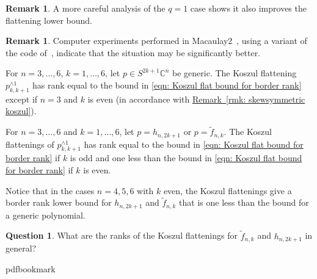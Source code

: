 \documentclass[11pt]{article}
\numberwithin{equation}{section}
\theoremstyle{definition}
\newtheorem{remark}[theorem]{Remark}
\newtheorem{question}[theorem]{Question}
\theoremstyle{plain}
\newcommand{\expref}[2]{\hyperref[#2]{#1~\ref{#2}}}
\newcommand{\vvirg}{ , \dots , }
\newcommand{\bbC}{\mathbb{C}}
\renewcommand{\tilde}[1]{\widetilde{#1}}
\begin{document}
 \begin{remark}
A more careful analysis of the $q=1$ case shows it also improves the flattening lower bound.
\end{remark}

\begin{remark}\label{koscomputer}
Computer experiments performed in Macaulay2~\cite{M2}, using a variant of the code of~\cite{OedOtt:EgnvectorsTensorsAlgorithmsWaringDecomp}, indicate that the situation may be significantly better. 

For $ n = 3 \vvirg 6$, $k = 1 \vvirg 6$, let $p \in S^{2k+1}\bbC^n$ be generic. The Koszul flattening $p_{k,k+1}^{\wedge 1}$ has rank equal to the bound in \eqref{eqn: Koszul flat bound for border rank} except if $n=3$ and $k$ is even (in accordance with \expref{Remark}{rmk: skewsymmetric koszul}).

For  $n = 3 \vvirg 6$ and $k= 1 \vvirg 6$, let $p = h_{n,2k+1}$ or $p = \tilde f_{n,k}$. The Koszul flattenings of $p_{k,k+1}^{\wedge 1}$ has rank equal to the bound in \eqref{eqn: Koszul flat bound for border rank} if $k$ is odd and one less than the bound in \eqref{eqn: Koszul flat bound for border rank} if $k$ is even.
\end{remark}

Notice that in the cases $n=4,5,6$ with $k$ even, the Koszul flattenings give a border rank lower bound for $h_{n,2k+1}$ and $\tilde f_{n,k}$ that is one less than the bound for a generic polynomial.


\begin{question} What are the ranks of the Koszul flattenings for $\tilde f_{n,k}$ and $h_{n,2k+1}$ in general?
\end{question}

\providecommand{\bibhead}[1]{}
\expandafter\ifx\csname pdfbookmark\endcsname\relax%
  \providecommand{\tocrefpdfbookmark}{}
\else\providecommand{\tocrefpdfbookmark}{%
   \hypertarget{tocreferences}{}%
   \pdfbookmark[1]{References}{tocreferences}}%
\fi
\end{document}
